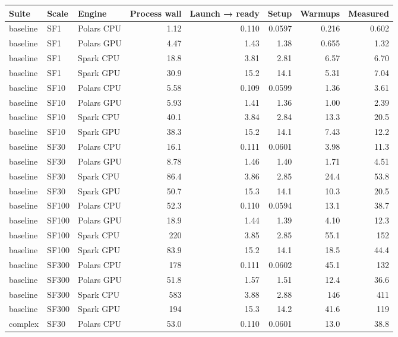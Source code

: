 \begin{longtable}{lllrrrrr}
\toprule
Suite & Scale & Engine & Process wall & Launch → ready & Setup & Warmups & Measured \\
\midrule
\endhead
\bottomrule
\endfoot
baseline & SF1 & Polars CPU & 1.12 & 0.110 & 0.0597 & 0.216 & 0.602 \\
baseline & SF1 & Polars GPU & 4.47 & 1.43 & 1.38 & 0.655 & 1.32 \\
baseline & SF1 & Spark CPU & 18.8 & 3.81 & 2.81 & 6.57 & 6.70 \\
baseline & SF1 & Spark GPU & 30.9 & 15.2 & 14.1 & 5.31 & 7.04 \\
baseline & SF10 & Polars CPU & 5.58 & 0.109 & 0.0599 & 1.36 & 3.61 \\
baseline & SF10 & Polars GPU & 5.93 & 1.41 & 1.36 & 1.00 & 2.39 \\
baseline & SF10 & Spark CPU & 40.1 & 3.84 & 2.84 & 13.3 & 20.5 \\
baseline & SF10 & Spark GPU & 38.3 & 15.2 & 14.1 & 7.43 & 12.2 \\
baseline & SF30 & Polars CPU & 16.1 & 0.111 & 0.0601 & 3.98 & 11.3 \\
baseline & SF30 & Polars GPU & 8.78 & 1.46 & 1.40 & 1.71 & 4.51 \\
baseline & SF30 & Spark CPU & 86.4 & 3.86 & 2.85 & 24.4 & 53.8 \\
baseline & SF30 & Spark GPU & 50.7 & 15.3 & 14.1 & 10.3 & 20.5 \\
baseline & SF100 & Polars CPU & 52.3 & 0.110 & 0.0594 & 13.1 & 38.7 \\
baseline & SF100 & Polars GPU & 18.9 & 1.44 & 1.39 & 4.10 & 12.3 \\
baseline & SF100 & Spark CPU & 220 & 3.85 & 2.85 & 55.1 & 152 \\
baseline & SF100 & Spark GPU & 83.9 & 15.2 & 14.1 & 18.5 & 44.4 \\
baseline & SF300 & Polars CPU & 178 & 0.111 & 0.0602 & 45.1 & 132 \\
baseline & SF300 & Polars GPU & 51.8 & 1.57 & 1.51 & 12.4 & 36.6 \\
baseline & SF300 & Spark CPU & 583 & 3.88 & 2.88 & 146 & 411 \\
baseline & SF300 & Spark GPU & 194 & 15.3 & 14.2 & 41.6 & 119 \\
complex & SF30 & Polars CPU & 53.0 & 0.110 & 0.0601 & 13.0 & 38.8 \\

\end{longtable}
